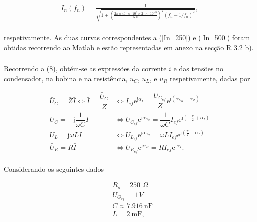 \documentclass[a4paper, titlepage, portuguese]{article}
\newcommand{\eq}{\Leftrightarrow} %
\begin{document}
		\begin{align}
			\label{In_500}
			I _ { n } \left( f _ { n } \right) = \frac {1} {  \sqrt { 1+ \left(\frac{2\pi \times \num{40e3} \times \num{2e-3}}{500} \right)^{2}   \left( f _ { n } - 1/ f _ { n } \right) ^ { 2} }}, \\
		\end{align}

	respetivamente. As duas curvas correspondentes a (\ref{In_250}) e (\ref{In_500}) foram obtidas recorrendo ao Matlab e estão representadas em anexo na secção R 3.2 b).


	\subsubsection{}

		Recorrendo a (8), obtém-se as expressões da corrente $i$ e das tensões no condensador, na bobina e na resistência, $u_C$, $u_L$, e $u_R$ respetivamente, dadas por

		\begin{align*}
			\bar{U}_G = \bar{Z} \bar{I} \eq \bar{I} = \dfrac{\bar{U}_G}{\bar{Z}} & \eq I_{ef} \mathrm{e}^{\mathrm{j} \alpha_I} = \dfrac{U_{G_{ef}}}{Z} \mathrm{e}^{\mathrm{j}\left(\alpha_{U_G} - \alpha_{Z}\right)}\\
			\bar{U}_C = -\mathrm{j} \dfrac{1}{\omega C} \bar{I} &\eq U_{C_{ef}} \mathrm{e}^{\mathrm{j} \alpha_{U_C}}= \dfrac{1}{\omega C}I_{ef} \mathrm{e}^{\mathrm{j} \left(-\frac{\pi}{2}+\alpha_I\right)} \\
			\bar{U}_L = \mathrm{j}\omega L \bar{I} &\eq U_{L_{ef}} \mathrm{e}^{\mathrm{j} \alpha_{U_C}}=\omega LI_{ef} \mathrm{e}^{\mathrm{j} \left(\frac{\pi}{2}+\alpha_I\right)}  \\
			\bar{U}_R = R \bar{I} &\eq {U}_{R_{ef}}\mathrm{e}^{\mathrm{j} \alpha_R}= R I_{ef} \mathrm{e}^{\mathrm{j} \alpha_I}.\\
		\end{align*}

		Considerando os seguintes dados

		\begin{align*}
			&R _ { s } = 250\hspace{4pt}\Omega \\
			&U_{G_{ef}} = 1\hspace{2pt}V\\
			&C \approx \SI{7.916}{\nano\farad}\\
			&L = \SI{2}{\milli\farad}, \\
		\end{align*}
\end{document}

